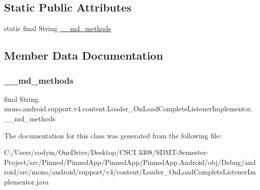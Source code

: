 \subsection*{Static Public Attributes}
\begin{DoxyCompactItemize}
\item 
static final String \hyperlink{classmono_1_1android_1_1support_1_1v4_1_1content_1_1_loader___on_load_complete_listener_implementor_ac414db5d27d8036b3792eef1cc8344f8}{\+\_\+\+\_\+md\+\_\+methods}
\end{DoxyCompactItemize}


\subsection{Member Data Documentation}
\mbox{\label{classmono_1_1android_1_1support_1_1v4_1_1content_1_1_loader___on_load_complete_listener_implementor_ac414db5d27d8036b3792eef1cc8344f8}} 
\subsubsection{\texorpdfstring{\+\_\+\+\_\+md\+\_\+methods}{\_\_md\_methods}}
{\footnotesize\ttfamily final String mono.\+android.\+support.\+v4.\+content.\+Loader\+\_\+\+On\+Load\+Complete\+Listener\+Implementor.\+\_\+\+\_\+md\+\_\+methods\hspace{0.3cm}{\ttfamily [static]}}



The documentation for this class was generated from the following file\+:\begin{DoxyCompactItemize}
\item 
C\+:/\+Users/codym/\+One\+Drive/\+Desktop/\+C\+S\+C\+I 3308/\+S\+D\+M\+T-\/\+Semester-\/\+Project/src/\+Pinned/\+Pinned\+App/\+Pinned\+App/\+Pinned\+App.\+Android/obj/\+Debug/android/src/mono/android/support/v4/content/Loader\+\_\+\+On\+Load\+Complete\+Listener\+Implementor.\+java\end{DoxyCompactItemize}
